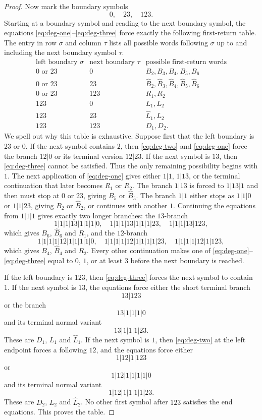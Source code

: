 \documentclass[11pt]{article}
\theoremstyle{definition}
\begin{document}
\begin{proof}
Now mark the boundary symbols
\[
 0,
 \quad 23,
 \quad 123.
\]
Starting at a boundary symbol and reading to the next boundary symbol, the equations \eqref{eq:deg-one}--\eqref{eq:deg-three} force exactly the following first-return table.  The entry in row $\sigma$ and column $\tau$ lists all possible words following $\sigma$ up to and including the next boundary symbol $\tau$.
\[
\begin{array}{c|c|l}
\text{left boundary }\sigma & \text{next boundary }\tau & \text{possible first-return words}\\
\hline
0\text{ or }23 & 0
 & B_2,
 B_3,
 B_4,
 B_5,
 B_6\\
0\text{ or }23 & 23
 & \widehat B_2,
 \widehat B_3,
 \widehat B_4,
 \widehat B_5,
 \widehat B_6\\
0\text{ or }23 & 123
 & R_1,
 R_2\\
123 & 0
 & L_1,
 L_2\\
123 & 23
 & \widehat L_1,
 \widehat L_2\\
123 & 123
 & D_1,
 D_2.
\end{array}
\tag{T}
\]
We spell out why this table is exhaustive.  Suppose first that the left boundary is $23$ or $0$.  If the next symbol contains $2$, then \eqref{eq:deg-two} and \eqref{eq:deg-one} force the branch $12|0$ or its terminal version $12|23$.  If the next symbol is $13$, then \eqref{eq:deg-three} cannot be satisfied.  Thus the only remaining possibility begins with $1$.  The next application of \eqref{eq:deg-one} gives either $1|1$, $1|13$, or the terminal continuation that later becomes $R_1$ or $R_2$.  The branch $1|13$ is forced to $1|13|1$ and then must stop at $0$ or $23$, giving $B_5$ or $\widehat B_5$.  The branch $1|1$ either stops as $1|1|0$ or $1|1|23$, giving $B_2$ or $\widehat B_2$, or continues with another $1$.  Continuing the equations from $1|1|1$ gives exactly two longer branches: the $13$-branch
\[
 1|1|1|13|1|1|1|0,
 \quad
 1|1|1|13|1|1|1|23,
 \quad
 1|1|1|13|123,
\]
which gives $B_6$, $\widehat B_6$ and $R_1$, and the $12$-branch
\[
 1|1|1|1|12|1|1|1|1|0,
 \quad
 1|1|1|1|12|1|1|1|1|23,
 \quad
 1|1|1|1|12|1|123,
\]
which gives $B_4$, $\widehat B_4$ and $R_2$.  Every other continuation makes one of \eqref{eq:deg-one}--\eqref{eq:deg-three} equal to $0$, $1$, or at least $3$ before the next boundary is reached.

If the left boundary is $123$, then \eqref{eq:deg-three} forces the next symbol to contain $1$.  If the next symbol is $13$, the equations force either the short terminal branch
\[
 13|123
\]
or the branch
\[
 13|1|1|1|0
\]
and its terminal normal variant
\[
 13|1|1|1|23.
\]
These are $D_1$, $L_1$ and $\widehat L_1$.  If the next symbol is $1$, then \eqref{eq:deg-two} at the left endpoint forces a following $12$, and the equations force either
\[
 1|12|1|123
\]
or
\[
 1|12|1|1|1|1|0
\]
and its terminal normal variant
\[
 1|12|1|1|1|1|23.
\]
These are $D_2$, $L_2$ and $\widehat L_2$.  No other first symbol after $123$ satisfies the end equations.  This proves the table.


\end{proof}
\end{document}

